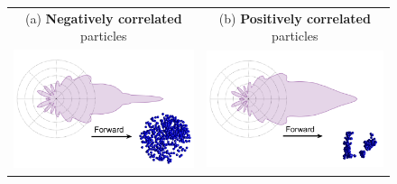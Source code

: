 \begin{figure}
    \centering
    \setlength{\resLen}{0.8in}
    \addtolength{\tabcolsep}{-3.5pt}
    \small
    \begin{tabular}{cc|cc}
        \multicolumn{2}{c|}{(a) \textbf{Negatively correlated} particles} &
        \multicolumn{2}{c}{(b) \textbf{Positively correlated} particles}
        \\
        \multicolumn{2}{c|}{\includegraphics[width=2\resLen]{images/pfunc/neg_merge.png}} & \multicolumn{2}{c}{\includegraphics[width=2\resLen]{images/pfunc/pos_merge.png}} 
        \\

\end{tabular}
\end{figure}
